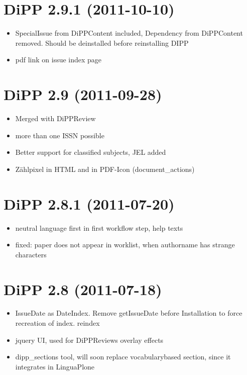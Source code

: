 \documentclass[a4paper,10pt,ngerman]{sphinxmanual}
\begin{document}
\section{DiPP 2.9.1 (2011-10-10)}
\label{changelog:dipp-2-9-1-2011-10-10}\begin{itemize}
\item {} 
SpecialIssue from DiPPContent included, Dependency from DiPPContent
removed. Should be deinstalled before reinstalling DIPP

\item {} 
pdf link on issue index page

\end{itemize}


\section{DiPP 2.9 (2011-09-28)}
\label{changelog:dipp-2-9-2011-09-28}\begin{itemize}
\item {} 
Merged with DiPPReview

\item {} 
more than one ISSN possible

\item {} 
Better support for classified subjects, JEL added

\item {} 
Zählpixel in HTML and in PDF-Icon (document\_actions)

\end{itemize}


\section{DiPP 2.8.1 (2011-07-20)}
\label{changelog:dipp-2-8-1-2011-07-20}\begin{itemize}
\item {} 
neutral language first in first workflow step, help texts

\item {} 
fixed: paper does not appear in worklist, when authorname has strange
characters

\end{itemize}


\section{DiPP 2.8 (2011-07-18)}
\label{changelog:dipp-2-8-2011-07-18}\begin{itemize}
\item {} 
IssueDate as DateIndex. Remove getIssueDate before Installation  to force
recreation of index. reindex

\item {} 
jquery UI, used for DiPPReviews overlay effects

\item {} 
dipp\_sections tool, will soon replace vocabularybased section, since
it integrates in LinguaPlone

\end{itemize}
\end{document}
